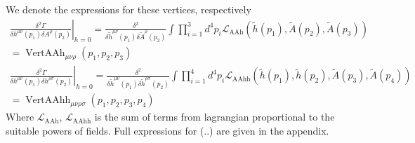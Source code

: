 \documentclass[11pt, a4paper]{article}
\begin{document}
We denote the expressions for these vertices, respectively
\begin{gather}
    \left. \frac{\delta^2 \Gamma}{\delta h^{\mu\nu}(p_1) \delta A^{\rho}(p_2)}\right|_{h=0} = \frac{\delta^2}{\delta \tilde{h}^{\mu\nu}(p_1) \delta \tilde{A}^{\rho}(p_2)} \int \prod_{i=1}^3 d^4 p_i \mathcal{L}_{\text{AAh}}\left(\tilde{h}(p_1), \tilde{A}(p_2), \tilde{A}(p_3)\right)\\
    = \operatorname{VertAAh}_{\mu\nu\rho}(p_1,p_2,p_3)\\
    \left. \frac{\delta^2 \Gamma}{\delta h^{\mu\nu}(p_1) \delta h^{\rho\sigma}(p_2)}\right|_{h=0} = \frac{\delta^2}{\delta \tilde{h}^{\mu\nu}(p_1) \delta \tilde{h}^{\rho\sigma}(p_2)} \int \prod_{i=1}^4 d^4 p_i \mathcal{L}_{\text{AAhh}}\left(\tilde{h}(p_1), \tilde{h}(p_2), \tilde{A}(p_3), \tilde{A}(p_4) \right)\\
     = \operatorname{VertAAhh}_{\mu\nu\rho\sigma}(p_1,p_2,p_3,p_4)
\end{gather}
Where $\mathcal{L}_{\text{AAh}}$, $\mathcal{L}_{\text{AAhh}}$ is the sum of terms from lagrangian proportional to the suitable powers of fields.
Full expressions for (..) are given in the appendix.
\end{document}
